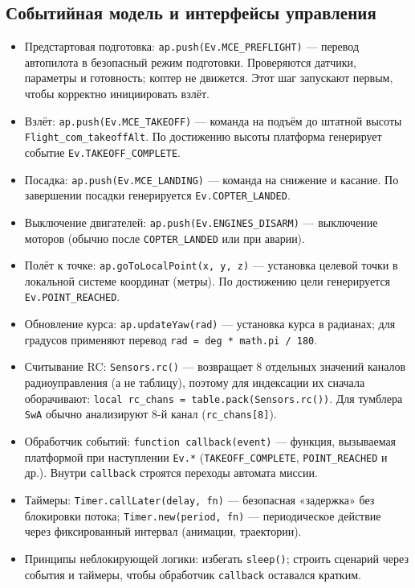 \subsection{Событийная модель и интерфейсы управления}
\begin{itemize}
  \item Предстартовая подготовка: \texttt{ap.push(Ev.MCE\_PREFLIGHT)} — перевод автопилота в безопасный режим подготовки. Проверяются датчики, параметры и готовность; коптер не движется. Этот шаг запускают первым, чтобы корректно инициировать взлёт.
  \item Взлёт: \texttt{ap.push(Ev.MCE\_TAKEOFF)} — команда на подъём до штатной высоты \texttt{Flight\_com\_takeoffAlt}. По достижению высоты платформа генерирует событие \texttt{Ev.TAKEOFF\_COMPLETE}.
  \item Посадка: \texttt{ap.push(Ev.MCE\_LANDING)} — команда на снижение и касание. По завершении посадки генерируется \texttt{Ev.COPTER\_LANDED}.
  \item Выключение двигателей: \texttt{ap.push(Ev.ENGINES\_DISARM)} — выключение моторов (обычно после \texttt{COPTER\_LANDED} или при аварии).
  \item Полёт к точке: \texttt{ap.goToLocalPoint(x, y, z)} — установка целевой точки в локальной системе координат (метры). По достижению цели генерируется \texttt{Ev.POINT\_REACHED}.
  \item Обновление курса: \texttt{ap.updateYaw(rad)} — установка курса в радианах; для градусов применяют перевод \texttt{rad = deg * math.pi / 180}.
  \item Считывание RC: \texttt{Sensors.rc()} — возвращает 8 отдельных значений каналов радиоуправления (а не таблицу), поэтому для индексации их сначала оборачивают: \texttt{local rc\_chans = table.pack(Sensors.rc())}. Для тумблера \texttt{SwA} обычно анализируют 8-й канал (\texttt{rc\_chans[8]}).
  \item Обработчик событий: \texttt{function callback(event)} — функция, вызываемая платформой при наступлении \texttt{Ev.*} (\texttt{TAKEOFF\_COMPLETE}, \texttt{POINT\_REACHED} и др.). Внутри \texttt{callback} строятся переходы автомата миссии.
  \item Таймеры: \texttt{Timer.callLater(delay, fn)} — безопасная «задержка» без блокировки потока; \texttt{Timer.new(period, fn)} — периодическое действие через фиксированный интервал (анимации, траектории).
  \item Принципы неблокирующей логики: избегать \texttt{sleep()}; строить сценарий через события и таймеры, чтобы обработчик \texttt{callback} оставался кратким.
\end{itemize}

